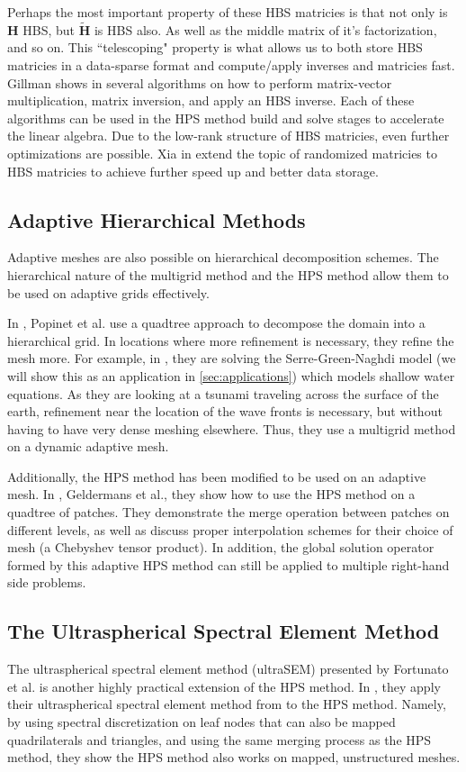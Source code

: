 Perhaps the most important property of these HBS matricies is that not only is $\textbf{H}$ HBS, but $\tilde{\textbf{H}}$ is HBS also. As well as the middle matrix of it's factorization, and so on. This ``telescoping" property is what allows us to both store HBS matricies in a data-sparse format and compute/apply inverses and matricies fast. Gillman shows in \citep{gillman2012direct} several algorithms on how to perform matrix-vector multiplication, matrix inversion, and apply an HBS inverse. Each of these algorithms can be used in the HPS method build and solve stages to accelerate the linear algebra. Due to the low-rank structure of HBS matricies, even further optimizations are possible. Xia in \citep{xia2013randomized} extend the topic of randomized matricies to HBS matricies to achieve further speed up and better data storage.

\subsection{Adaptive Hierarchical Methods}

Adaptive meshes are also possible on hierarchical decomposition schemes. The hierarchical nature of the multigrid method and the HPS method allow them to be used on adaptive grids effectively.

In \citep{popinet2015quadtree}, Popinet et al. use a quadtree approach to decompose the domain into a hierarchical grid. In locations where more refinement is necessary, they refine the mesh more. For example, in \citep{popinet2015quadtree}, they are solving the Serre-Green-Naghdi model (we will show this as an application in \ref{sec:applications}) which models shallow water equations. As they are looking at a tsunami traveling across the surface of the earth, refinement near the location of the wave fronts is necessary, but without having to have very dense meshing elsewhere. Thus, they use a multigrid method on a dynamic adaptive mesh.

Additionally, the HPS method has been modified to be used on an adaptive mesh. In \citep{geldermans2019adaptive}, Geldermans et al., they show how to use the HPS method on a quadtree of patches. They demonstrate the merge operation between patches on different levels, as well as discuss proper interpolation schemes for their choice of mesh (a Chebyshev tensor product). In addition, the global solution operator formed by this adaptive HPS method can still be applied to multiple right-hand side problems.

\subsection{The Ultraspherical Spectral Element Method}

The ultraspherical spectral element method (ultraSEM) presented by Fortunato et al. is another highly practical extension of the HPS method. In \citep{fortunato2020ultraspherical}, they apply their ultraspherical spectral element method from \citep{olver2013fast} to the HPS method. Namely, by using spectral discretization on leaf nodes that can also be mapped quadrilaterals and triangles, and using the same merging process as the HPS method, they show the HPS method also works on mapped, unstructured meshes.
